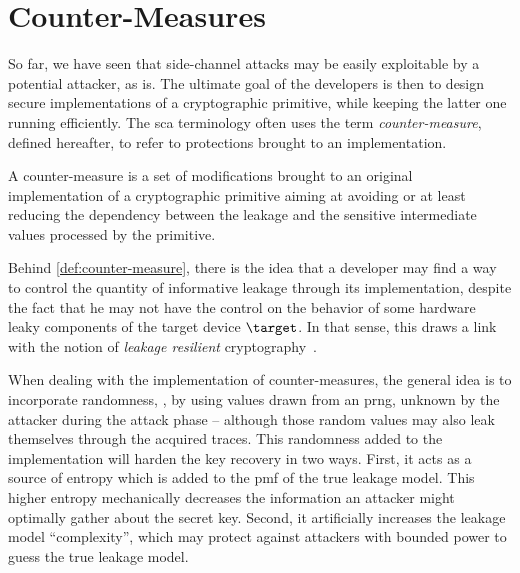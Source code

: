 \section{Counter-Measures}
    \label{sec:counter-measures}
    So far, we have seen that side-channel attacks may be easily exploitable by a potential attacker, as is.
    The ultimate goal of the developers is then to design secure implementations of a cryptographic primitive, while keeping the latter one running efficiently.
    The \gls{sca} terminology often uses the term \emph{counter-measure}, defined hereafter, to refer to protections brought to an implementation.
    \begin{definition}
        A counter-measure is a set of modifications brought to an original implementation of a cryptographic primitive aiming at avoiding or at least reducing the dependency between the leakage and the sensitive intermediate values processed by the primitive.
        \label{def:counter-measure}
    \end{definition}
    Behind \autoref{def:counter-measure}, there is the idea that a developer may find a way to control the quantity of informative leakage through its implementation, despite the fact that he may not have the control on the behavior of some hardware leaky components of the target device \(\target\).
    In that sense, this draws a link with the notion of \emph{leakage resilient} \gls{cryptography}~\cite{kalai_leakage_2019}.

    When dealing with the implementation of counter-measures, the general idea is to incorporate randomness, \eg{}, by using values drawn from an \gls{prng}, unknown by the attacker during the attack phase -- although those random values may also leak themselves through the acquired traces.
    This randomness added to the implementation will harden the key recovery in two ways.
    First, it acts as a source of entropy which is added to the \gls{pmf} of the true leakage model.
    This higher entropy mechanically decreases the information an attacker might optimally gather about the secret key.
    Second, it artificially increases the leakage model ``complexity'', which may protect against attackers with bounded power to guess the true leakage model.

